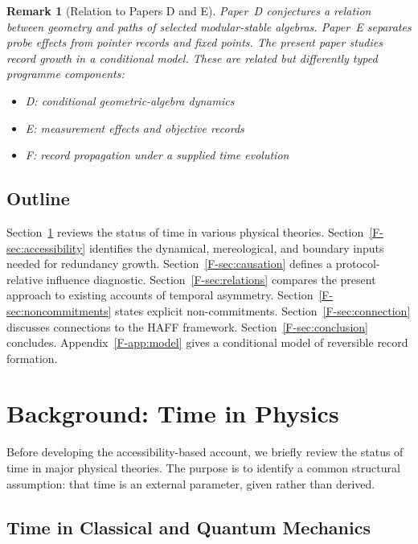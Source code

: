\documentclass[12pt,a4paper,openany]{book}
\newtheorem{remark}[theorem]{Remark}
\begin{document}
\begin{remark}[Relation to Papers D and E]
Paper~D \cite{Liu2026PaperD} conjectures a relation between geometry and paths of selected modular-stable algebras. Paper~E \cite{Liu2026PaperE} separates probe effects from pointer records and fixed points. The present paper studies record growth in a conditional model. These are related but differently typed programme components:
\begin{itemize}
    \item D: conditional geometric-algebra dynamics
    \item E: measurement effects and objective records
    \item F: record propagation under a supplied time evolution
\end{itemize}
\end{remark}

\subsection{Outline}

Section~\ref{F-sec:background} reviews the status of time in various physical theories. Section~\ref{F-sec:accessibility} identifies the dynamical, mereological, and boundary inputs needed for redundancy growth. Section~\ref{F-sec:causation} defines a protocol-relative influence diagnostic. Section~\ref{F-sec:relations} compares the present approach to existing accounts of temporal asymmetry. Section~\ref{F-sec:noncommitments} states explicit non-commitments. Section~\ref{F-sec:connection} discusses connections to the HAFF framework. Section~\ref{F-sec:conclusion} concludes. Appendix~\ref{F-app:model} gives a conditional model of reversible record formation.

\section{Background: Time in Physics}
\label{F-sec:background}

Before developing the accessibility-based account, we briefly review the status of time in major physical theories. The purpose is to identify a common structural assumption: that time is an external parameter, given rather than derived.

\subsection{Time in Classical and Quantum Mechanics}
\end{document}
